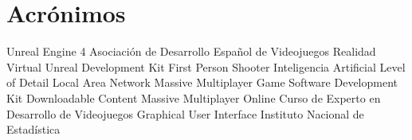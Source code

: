 \section*{Acrónimos}

{\small
\begin{acronym}[XXXXXXXX]
  	 {Unreal Engine 4}
  	 {Asociación de Desarrollo Español de Videojuegos}
  		 {Realidad Virtual}
   	 {Unreal Development Kit}
  	 {First Person Shooter}
  		 {Inteligencia Artificial}
  	 {Level of Detail}
  	 {Local Area Network}
  	 {Massive Multiplayer Game}
       {Software Development Kit}
  	 {Downloadable Content}
  	 {Massive Multiplayer Online}
  	 {Curso de Experto en Desarrollo de Videojuegos}
  	 {Graphical User Interface}
  	 {Instituto Nacional de Estadística}
\end{acronym}
}

